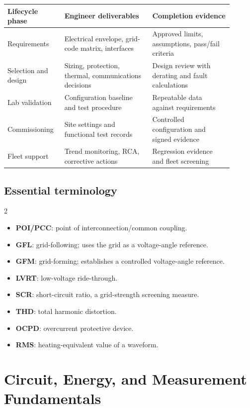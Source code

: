 \documentclass[11pt]{article}
\begin{document}
\begin{longtable}{p{0.21\linewidth}p{0.36\linewidth}p{0.33\linewidth}}
\toprule
Lifecycle phase & Engineer deliverables & Completion evidence \\
\midrule
Requirements & Electrical envelope, grid-code matrix, interfaces & Approved limits, assumptions, pass/fail criteria \\
Selection and design & Sizing, protection, thermal, communications decisions & Design review with derating and fault calculations \\
Lab validation & Configuration baseline and test procedure & Repeatable data against requirements \\
Commissioning & Site settings and functional test records & Controlled configuration and signed evidence \\
Fleet support & Trend monitoring, RCA, corrective actions & Regression evidence and fleet screening \\
\bottomrule
\end{longtable}

\subsection{Essential terminology}
\begin{multicols}{2}
\begin{itemize}
\item \textbf{POI/PCC}: point of interconnection/common coupling.
\item \textbf{GFL}: grid-following; uses the grid as a voltage-angle reference.
\item \textbf{GFM}: grid-forming; establishes a controlled voltage-angle reference.
\item \textbf{LVRT}: low-voltage ride-through.
\item \textbf{SCR}: short-circuit ratio, a grid-strength screening measure.
\item \textbf{THD}: total harmonic distortion.
\item \textbf{OCPD}: overcurrent protective device.
\item \textbf{RMS}: heating-equivalent value of a waveform.
\end{itemize}
\end{multicols}

\section{Circuit, Energy, and Measurement Fundamentals}
\end{document}
